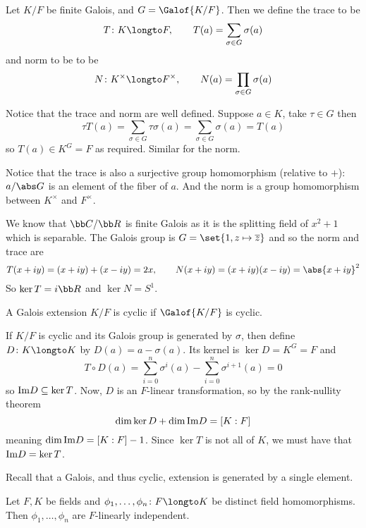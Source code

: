 \bdefn

    Let $K/F$ be finite Galois, and $G=\Galof{K/F}$.
    Then we define the {\emphcolor trace} to be
    $$ T\colon K\longto F,\qquad T(a) = \sum_{\sigma\in G}\sigma(a) $$
    and {\emphcolor norm} to be to be
    $$ N\colon K^\times\longto F^\times,\qquad N(a) = \prod_{\sigma\in G}\sigma(a) $$

\edefn

Notice that the trace and norm are well defined.
Suppose $a\in K$, take $\tau\in G$ then
$$ \tau T(a) = \sum_{\sigma\in G}\tau\sigma(a) = \sum_{\sigma\in G}\sigma(a) = T(a) $$
so $T(a)\in K^G=F$ as required.
Similar for the norm.

Notice that the trace is also a surjective group homomorphism (relative to $+$): $a/\abs G$ is an element of the fiber of $a$.
And the norm is a group homomorphism between $K^\times$ and $F^\times$.

\bexam

    We know that ${\bb C}/{\bb R}$ is finite Galois as it is the splitting field of $x^2+1$ which is separable.
    The Galois group is $G=\set{1,z\mapsto\overline z}$ and so the norm and trace are
    $$ T(x+iy) = (x+iy) + (x-iy) = 2x,\qquad N(x+iy) = (x+iy)(x-iy) = \abs{x+iy}^2 $$
    So $\ker T=i{\bb R}$ and $\ker N=S^1$.

\eexam

\bdefn

    A Galois extension $K/F$ is {\emphcolor cyclic} if $\Galof{K/F}$ is cyclic.

\edefn

If $K/F$ is cyclic and its Galois group is generated by $\sigma$, then define $D\colon K\longto K$ by $D(a)=a-\sigma(a)$.
Its kernel is $\ker D=K^G=F$ and
$$ T\circ D(a) = \sum_{i=0}^n\sigma^i(a) - \sum_{i=0}^n\sigma^{i+1}(a) = 0 $$
so ${\rm Im}D\subseteq\ker T$.
Now, $D$ is an $F$-linear transformation, so by the rank-nullity theorem
$$ \dim\ker D + \dim{\rm Im}D = [K:F] $$
meaning $\dim{\rm Im}D=[K:F]-1$.
Since $\ker T$ is not all of $K$, we must have that ${\rm Im}D=\ker T$.

Recall that a Galois, and thus cyclic, extension is generated by a single element.

\blemm[title=Dedekind's Lemma, name=dedekindlemm]

    Let $F,K$ be fields and $\phi_1,\dots,\phi_n\colon F\longto K$ be distinct field homomorphisms.
    Then $\phi_1,\dots,\phi_n$ are $F$-linearly independent.

\elemm

